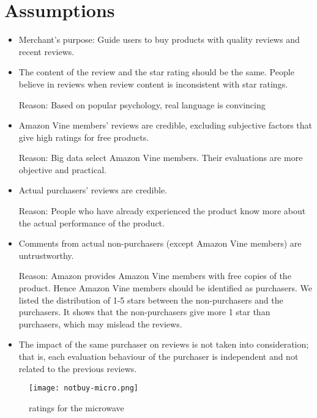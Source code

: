 \documentclass{mcmthesis}
\begin{document}
\section{Assumptions}
\begin{itemize}
  \item Merchant's purpose: Guide users to buy products with quality reviews and recent reviews.
\end{itemize}
\begin{itemize}
  \item The content of the review and the star rating should be the same. People believe in reviews when review content is inconsistent with star ratings.

Reason: Based on popular psychology, real language is convincing 
\end{itemize}
\begin{itemize}
  \item Amazon Vine members' reviews are credible, excluding subjective factors that give high ratings for free products.

Reason: Big data select Amazon Vine members. Their evaluations are more objective and practical.
\end{itemize}
\begin{itemize}
  \item Actual purchasers' reviews are credible.

Reason: People who have already experienced the product know more about the actual performance of the product.
\end{itemize}
\begin{itemize}
  \item Comments from actual non-purchasers (except Amazon Vine members) are untrustworthy.

Reason: Amazon provides Amazon Vine members with free copies of the product. Hence Amazon Vine members should be identified as purchasers. We listed the distribution of 1-5 stars between the non-purchasers and the purchasers. It shows that the non-purchasers give more 1 star than purchasers, which may mislead the reviews.
\end{itemize}
\begin{itemize}
  \item The impact of the same purchaser on reviews is not taken into consideration; that is, each evaluation behaviour of the purchaser is independent and not related to the previous reviews.
\end{itemize}
\begin{figure}[h]
  \small
  \centering
  \texttt{[image: notbuy-micro.png]}
  \caption{ratings for the microwave}
\end{figure}
\end{document}
